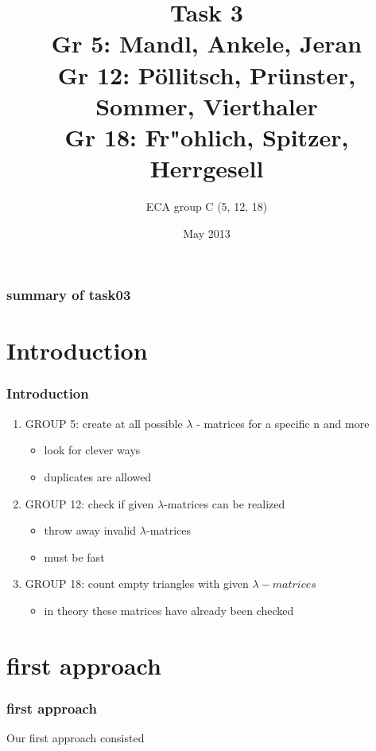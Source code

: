 \documentclass{beamer}
\title{Task 3 \\ \small{Gr 5: Mandl, Ankele, Jeran\\Gr 12: P\"ollitsch, Pr\"unster, Sommer, Vierthaler\\Gr 18: Fr"ohlich, Spitzer, Herrgesell}}
\author{ECA group C (5, 12, 18)}
\date{May 2013}
\begin{document}
\begin{frame}[plain]
	\titlepage
\end{frame}

\begin{frame}
\frametitle{summary of task03}
\end{frame}

\section{Introduction}
\begin{frame}
\frametitle{Introduction}
\begin{enumerate}
\item GROUP 5: create at all possible $\lambda$ - matrices for a specific n and more
  \begin{itemize}
  \item look for clever ways
  \item duplicates are allowed
  \end{itemize}
\item GROUP 12: check if given $\lambda$-matrices can be realized
  \begin{itemize}
  \item throw away invalid $\lambda$-matrices
  \item must be fast
  \end{itemize}
\item GROUP 18: count empty triangles with given $\lambda-matrices$
    \begin{itemize}
    \item in theory these matrices have already been checked
    \end{itemize}
\end{enumerate}
\end{frame}



\section{first approach}
\begin{frame}
\frametitle{first approach}
Our first approach consisted 
\end{frame}




\end{document}
